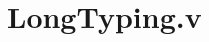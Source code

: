 \documentclass[DIV=26]{scrartcl}
\begin{document}
\section*{LongTyping.v}
\inputminted[linenos, style=bw, breaklines]{coq}{LongTyping.v}
\end{document}
